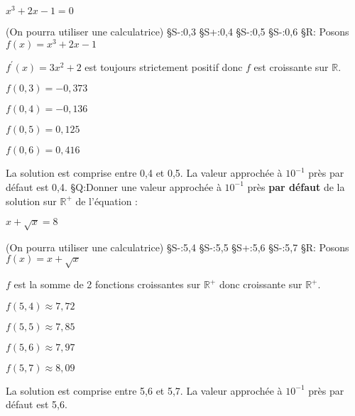 \par
$x^{3}+2x-1=0$
\par
(On pourra utiliser une calculatrice)
§S-:0,3
§S+:0,4
§S-:0,5
§S-:0,6
§R: Posons $f\left(x\right)=x^{3}+2x-1$
\par
$f^{\prime}\left(x\right)=3x^{2}+2$ est toujours strictement positif donc $f$ est croissante sur $\mathbb{R}$.
\par
$f\left(0,3\right)=-0,373$
\par
$f\left(0,4\right)=-0,136$
\par
$f\left(0,5\right)=0,125$
\par
$f\left(0,6\right)=0,416$
\par
La solution est comprise entre 0,4 et 0,5.  La valeur approchée à $10^{-1}$ près par défaut est 0,4.
§Q:Donner une valeur approchée à $10^{-1}$ près \textbf{par défaut} de la solution sur $\mathbb{R}^+$ de l'équation :
\par
$x+\sqrt{x}=8$
\par
(On pourra utiliser une calculatrice)
§S-:5,4
§S-:5,5
§S+:5,6
§S-:5,7
§R: Posons $f\left(x\right)=x+\sqrt{x}$
\par
$f$ est la somme de 2 fonctions croissantes sur  $\mathbb{R}^+$ donc croissante sur $\mathbb{R}^+$.
\par
$f\left(5,4\right)\approx 7,72$
\par
$f\left(5,5\right)\approx 7,85$
\par
$f\left(5,6\right)\approx 7,97$
\par
$f\left(5,7\right)\approx 8,09$
\par
La solution est comprise entre 5,6 et 5,7. La valeur approchée à $10^{-1}$ près par défaut est 5,6.
\par
